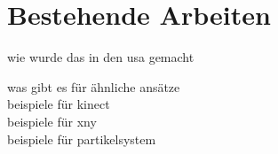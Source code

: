 \chapter{Bestehende Arbeiten}
\begin{Spacing}{\mylinespace}

wie wurde das in den usa gemacht\\

\cite{Kreylos2010}

was gibt es für ähnliche ansätze\\
beispiele für kinect\\
beispiele für xny\\
beispiele für partikelsystem\\

\end{Spacing}
\newpage
\clearpage
